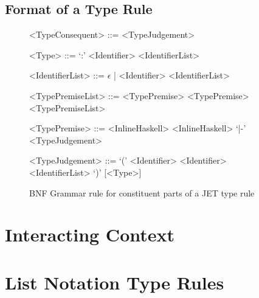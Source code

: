 \subsection{Format of a Type Rule}
\begin{figure}[]
    \begin{grammar}
        <TypeConsequent> ::=  <TypeJudgement>
        
        <Type> ::= `:' <Identifier> <IdentifierList>
    
        <IdentifierList> ::= $\epsilon$ | <Identifier> <IdentifierList>
    
        <TypePremiseList> ::= <TypePremise> 
            \alt <TypePremise> <TypePremiseList>
    
        <TypePremise> ::= <InlineHaskell>
            \alt <InlineHaskell> `|-'  <TypeJudgement>
    
        <TypeJudgement> ::= `(' <Identifier> <Identifier> <IdentifierList> `)' [<Type>]
    \end{grammar}
    \caption{BNF Grammar rule for constituent parts of a JET type rule}
    \label{}
\end{figure}

\section{Interacting Context}
\section{List Notation Type Rules}

%
%
%
%
%